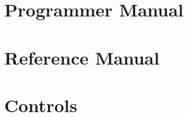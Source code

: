 \documentclass{dabcclass}
\begin{document}
\part{Programmer Manual}
 \cleardoublepage
\part{Reference Manual}
 \cleardoublepage
\part{Controls}
 \cleardoublepage

\thispagestyle{empty}
 \cleardoublepage

\end{document}
